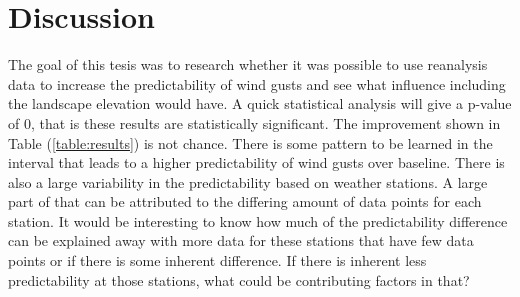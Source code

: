 \chapter{Discussion}
\label{Chapter5}
The goal of this tesis was to research whether it was possible to use reanalysis data to increase the predictability of wind gusts and see what influence including the landscape elevation would have. A quick statistical analysis will give a p-value of 0, that is these results are statistically significant. The improvement shown in Table (\ref{table:results}) is not chance. There is some pattern to be learned in the interval that leads to a higher predictability of wind gusts over baseline. There is also a large variability in the predictability based on weather stations. A large part of that can be attributed to the differing amount of data points for each station. It would be interesting to know how much of the predictability difference can be explained away with more data for these stations that have few data points or if there is some inherent difference. If there is inherent less predictability at those stations, what could be contributing factors in that?